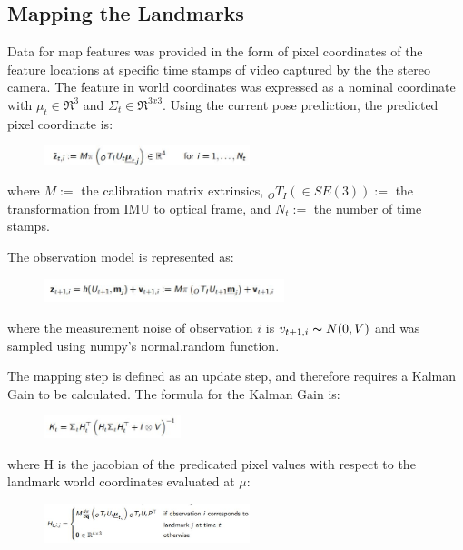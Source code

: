 \documentclass[conference]{IEEEtran}
\begin{document}
\subsection{Mapping the Landmarks}

Data for map features was provided in the form of pixel coordinates of the feature locations at specific time stamps of video captured by the the stereo camera.
The feature in world coordinates was expressed as a nominal coordinate with $\mu_{t} \in \Re^{3}$ and $\Sigma_{t} \in \Re^{3x3}$.
Using the current pose prediction, the predicted pixel coordinate is:

\begin{figure}[H]
\centerline{\includegraphics[width=60mm]{eqns/eq13.jpg}}
\end{figure} 

where $M := $ the calibration matrix extrinsics, ${}_{O}T_{I} (\in SE(3)) :=$ the transformation from IMU to optical frame, and $N_{t} := $ the number of time stamps.

The observation model is represented as:
\begin{figure}[H]
\centerline{\includegraphics[width=70mm]{eqns/eq7.jpg}}
\end{figure} 

where the measurement noise of observation $i$ is $v_{t+1, i} \thicksim N(0,V) $ and was sampled using numpy's normal.random function.

The mapping step is defined as an update step, and therefore requires a Kalman Gain to be calculated. The formula for the Kalman Gain is:

\begin{figure}[H]
\centerline{\includegraphics[width=40mm]{eqns/kg.jpg}}
\end{figure} 

where H is the jacobian of the predicated pixel values with respect to the landmark world coordinates evaluated at $\mu$:

\begin{figure}[H]
\centerline{\includegraphics[width=60mm]{eqns/H.jpg}}
\end{figure} 
\end{document}
